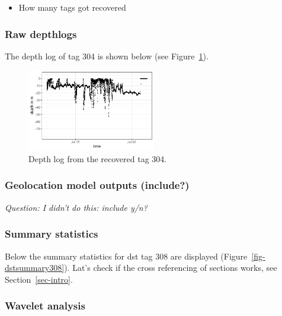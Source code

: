 \documentclass[
  authoryear,
  review,
  3p]{elsarticle}
\providecommand{\tightlist}{%
  \setlength{\itemsep}{0pt}\setlength{\parskip}{0pt}}\usepackage{longtable,booktabs,array}
\begin{document}
\begin{itemize}
\tightlist
\item
  How many tags got recovered
\end{itemize}

\hypertarget{raw-depthlogs}{%
\subsubsection{Raw depthlogs}\label{raw-depthlogs}}

The depth log of tag 304 is shown below (see Figure~\ref{fig-dst304}).

\begin{figure}

{\centering \includegraphics[width=0.5\textwidth,height=\textheight]{index_files/figure-pdf/fig-dst304-1.pdf}

}

\caption{\label{fig-dst304}Depth log from the recovered tag 304.}

\end{figure}

\hypertarget{geolocation-model-outputs-include}{%
\subsubsection{Geolocation model outputs
(include?)}\label{geolocation-model-outputs-include}}

\emph{Question: I didn't do this: include y/n?}

\hypertarget{sec-results-dst-summary}{%
\subsubsection{Summary statistics}\label{sec-results-dst-summary}}

Below the summary statistics for dst tag 308 are displayed
(Figure~\ref{fig-dstsummary308}). Lat's check if the cross referencing
of sections works, see Section~\ref{sec-intro}.

\hypertarget{wavelet-analysis}{%
\subsubsection{Wavelet analysis}\label{wavelet-analysis}}
\end{document}

